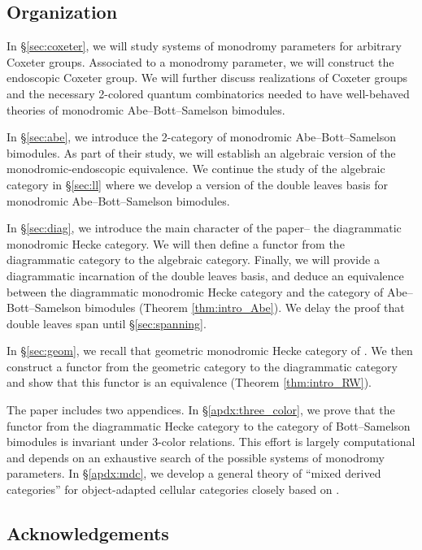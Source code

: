 \documentclass{amsart}
\theoremstyle{definition}
\numberwithin{equation}{subsection}
\begin{document}
\subsection{Organization}

In \S\ref{sec:coxeter}, we will study systems of monodromy parameters for arbitrary Coxeter groups. Associated to a monodromy parameter, we will construct the endoscopic Coxeter group.
We will further discuss realizations of Coxeter groups and the necessary 2-colored quantum combinatorics needed to have well-behaved theories of monodromic Abe--Bott--Samelson bimodules.

In \S\ref{sec:abe}, we introduce the 2-category of monodromic Abe--Bott--Samelson bimodules. As part of their study, we will establish an algebraic version of the monodromic-endoscopic equivalence. We continue the study of the algebraic category in \S\ref{sec:ll} where we develop a version of the double leaves basis for monodromic Abe--Bott--Samelson bimodules.

In \S\ref{sec:diag}, we introduce the main character of the paper-- the diagrammatic monodromic Hecke category. We will then define a functor from the diagrammatic category to the algebraic category.
Finally, we will provide a diagrammatic incarnation of the double leaves basis, and deduce an equivalence between the diagrammatic monodromic Hecke category and the category of Abe--Bott--Samelson bimodules (Theorem \ref{thm:intro_Abe}).
We delay the proof that double leaves span until \S\ref{sec:spanning}.

In \S\ref{sec:geom}, we recall that geometric monodromic Hecke category of \cite{Sandvik}. We then construct a functor from the geometric category to the diagrammatic category and show that this functor is an equivalence (Theorem \ref{thm:intro_RW}).

The paper includes two appendices. In \S\ref{apdx:three_color}, we prove that the functor from the diagrammatic Hecke category to the category of Bott--Samelson bimodules is invariant under 3-color relations.
This effort is largely computational and depends on an exhaustive search of the possible systems of monodromy parameters. In \S\ref{apdx:mdc}, we develop a general theory of ``mixed derived categories'' for object-adapted cellular categories closely based on \cite{ARV}.   

\subsection{Acknowledgements}
\end{document}
